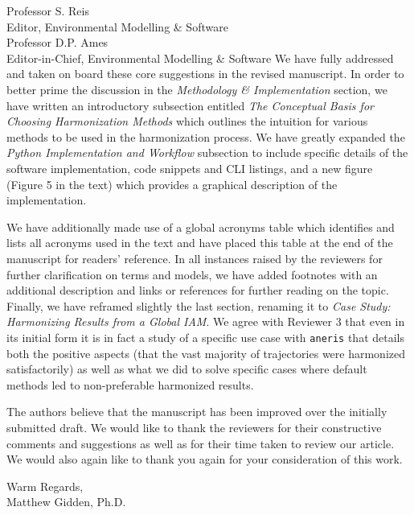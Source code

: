 \documentclass[11pt]{letter} %
\begin{document}
\begin{letter}{
    Professor S. Reis\\
    Editor, Environmental Modelling \& Software\\
    \hfill\break
    Professor D.P. Ames\\
    Editor-in-Chief, Environmental Modelling \& Software
    \hfill\break
  }
We have fully addressed and taken on board these core suggestions in the revised
manuscript. In order to better prime the discussion in the \textit{Methodology \&
  Implementation} section, we have written an introductory subsection entitled
\textit{The Conceptual Basis for Choosing Harmonization Methods} which outlines
the intuition for various methods to be used in the harmonization process. We
have greatly expanded the \textit{Python Implementation and Workflow} subsection
to include specific details of the software implementation, code snippets and
CLI listings, and a new figure (Figure 5 in the text) which provides a graphical
description of the implementation.

We have additionally made use of a global acronyms table which identifies and
lists all acronyms used in the text and have placed this table at the end of the
manuscript for readers' reference. In all instances raised by the reviewers for
further clarification on terms and models, we have added footnotes with an
additional description and links or references for further reading on the
topic. Finally, we have reframed slightly the last section, renaming it to
\textit{Case Study: Harmonizing Results from a Global IAM}. We agree with
Reviewer 3 that even in its initial form it is in fact a study of a specific use
case with \texttt{aneris} that details both the positive aspects (that the vast
majority of trajectories were harmonized satisfactorily) as well as what we did
to solve specific cases where default methods led to non-preferable harmonized
results.

The authors believe that the manuscript has been improved over the initially
submitted draft. We would like to thank the reviewers for their constructive
comments and suggestions as well as for their time taken to review our
article. We would also again like to thank you again for your consideration of
this work.

\closing{
  \hfill\break
  \hfill\break
  Warm Regards,\\
  \hfill\break
  Matthew Gidden, Ph.D.
}


\end{letter}
\end{document}
